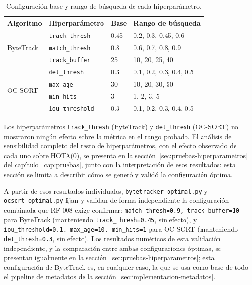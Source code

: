 \begin{table}[htp]
\centering
\caption{Configuración base y rango de búsqueda de cada hiperparámetro.}
\label{tab:impl-hiperparametros-espacio}
\renewcommand{\arraystretch}{1.25}
\begin{tabular}{|p{2.6cm}|p{3.1cm}|p{1.6cm}|p{5.7cm}|}
\hline
\rowcolor{gray!25}
\textbf{Algoritmo} & \textbf{Hiperparámetro} & \textbf{Base} & \textbf{Rango de búsqueda} \\
\hline
\multirow{3}{*}{ByteTrack} & \texttt{track\_thresh} & 0.45 & 0.2, 0.3, 0.45, 0.6 \\
\cline{2-4}
 & \texttt{match\_thresh} & 0.8 & 0.6, 0.7, 0.8, 0.9 \\
\cline{2-4}
 & \texttt{track\_buffer} & 25 & 10, 20, 25, 40 \\
\hline
\multirow{4}{*}{OC-SORT} & \texttt{det\_thresh} & 0.3 & 0.1, 0.2, 0.3, 0.4, 0.5 \\
\cline{2-4}
 & \texttt{max\_age} & 30 & 10, 20, 30, 50 \\
\cline{2-4}
 & \texttt{min\_hits} & 3 & 1, 2, 3, 5 \\
\cline{2-4}
 & \texttt{iou\_threshold} & 0.3 & 0.1, 0.2, 0.3, 0.4, 0.5 \\
\hline
\end{tabular}
\end{table}

Los hiperparámetros \texttt{track\_thresh} (ByteTrack) y
\texttt{det\_thresh} (OC-SORT) no mostraron ningún efecto sobre la
métrica en el rango probado. El análisis de sensibilidad completo del
resto de hiperparámetros, con el efecto observado de cada uno sobre
HOTA(0), se presenta en la sección~\ref{sec:pruebas-hiperparametros} del
capítulo~\ref{cap:pruebas}, junto con la interpretación de esos
resultados: esta sección se limita a describir cómo se generó y validó la
configuración óptima.

A partir de esos resultados individuales, \texttt{bytetracker\_optimal.py}
y \texttt{ocsort\_optimal.py} fijan y validan de forma independiente la
configuración combinada que RF-008 exige confirmar:
\texttt{match\_thresh=0.9, track\_buffer=10} para ByteTrack (manteniendo
\texttt{track\_thresh=0.45}, sin efecto), y
\texttt{iou\_threshold=0.1, max\_age=10, min\_hits=1} para OC-SORT
(manteniendo \texttt{det\_thresh=0.3}, sin efecto). Los resultados
numéricos de esta validación independiente, y la comparación entre ambas
configuraciones óptimas, se presentan igualmente en la
sección~\ref{sec:pruebas-hiperparametros}; esta configuración de
ByteTrack es, en cualquier caso, la que se usa como base de todo el
pipeline de metadatos de la sección~\ref{sec:implementacion-metadatos}.

